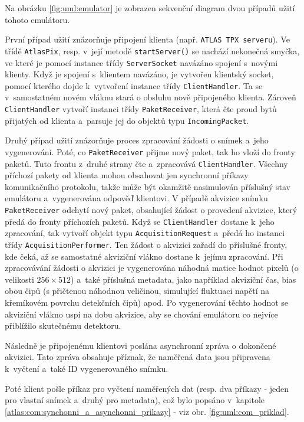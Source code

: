 Na obrázku \ref{fig:uml:emulator} je zobrazen sekvenční diagram dvou případů užití tohoto emulátoru.

První případ užití znázorňuje připojení klienta (např. \texttt{ATLAS TPX serveru}). Ve třídě \texttt{AtlasPix}, resp. v~její metodě \texttt{startServer()} se nachází nekonečná smyčka, ve které je pomocí instance třídy \texttt{ServerSocket} navázáno spojení s~novými klienty. Když je spojení s~klientem navázáno, je vytvořen klientský socket, pomocí kterého dojde k~vytvoření instance třídy \texttt{ClientHandler}. Ta se v~samostatném novém vláknu stará o obsluhu nově připojeného klienta. Zároveň \texttt{ClientHandler} vytvoří instanci třídy \texttt{PaketReceiver}, která čte proud bytů přijatých od klienta a~parsuje jej do objektů typu \texttt{IncomingPacket}.

Druhý případ užití znázorňuje proces zpracování žádosti o snímek a~jeho vygenerování. Poté, co \texttt{PaketReceiver} přijme nový paket, tak ho vloží do fronty paketů. Tuto frontu z~druhé strany čte a~zpracovává \texttt{ClientHandler}. Všechny příchozí pakety od klienta mohou obsahovat jen synchronní příkazy komunikačního protokolu, takže může být okamžitě nasimulován příslušný stav emulátoru a~vygenerována odpověď klientovi. 
V případě akvizice snímku \texttt{PaketReceiver} odchytí nový paket, obsahující žádost o provedení akvizice, který předá do fronty příchozích paketů. Když se \texttt{ClientHandler} dostane k~jeho zpracování, tak vytvoří objekt typu \texttt{AcquisitionRequest} a~předá ho instanci třídy \texttt{AcquisitionPerformer}. Ten žádost o akvizici zařadí do příslušné fronty, kde čeká, až se samostatné akviziční vlákno dostane k~jejímu zpracování. Při zpracovávání žádosti o akvizici je vygenerována náhodná matice hodnot pixelů (o velikosti $256\times512$) a~také příslušná metadata, jako například akviziční čas, bias obou čipů (s přičtenou náhodnou veličinou, simulující fluktuaci napětí na křemíkovém povrchu detekčních čipů) apod. Po vygenerování těchto hodnot se akviziční vlákno uspí na dobu akvizice, aby se chování emulátoru co nejvíce přiblížilo skutečnému detektoru.

Následně je připojenému klientovi poslána asynchronní zpráva o dokončené akvizici. Tato zpráva obsahuje příznak, že naměřená data jsou připravena k~vyčtení a~také ID vygenerovaného snímku. 

Poté klient pošle příkaz pro vyčtení naměřených dat (resp. dva příkazy - jeden pro vlastní snímek a~druhý pro metadata), což bylo popsáno v~kapitole \ref{atlas:com:synchonni_a_asynchonni_prikazy} - viz obr. \ref{fig:uml:com_priklad}.


